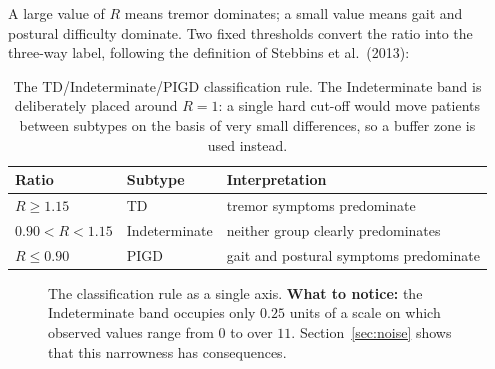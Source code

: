 \documentclass[11pt,a4paper]{article}
\begin{document}
A large value of $R$ means tremor dominates; a small value means gait and
postural difficulty dominate. Two fixed thresholds convert the ratio into the
three-way label, following the definition of Stebbins et al.\ (2013):

\begin{table}[H]
\centering
\begin{tabular}{@{}lll@{}}
\toprule
\textbf{Ratio} & \textbf{Subtype} & \textbf{Interpretation} \\
\midrule
$R \geq 1.15$        & TD            & tremor symptoms predominate \\
$0.90 < R < 1.15$    & Indeterminate & neither group clearly predominates \\
$R \leq 0.90$        & PIGD          & gait and postural symptoms predominate \\
\bottomrule
\end{tabular}
\caption{The TD/Indeterminate/PIGD classification rule. The Indeterminate band
is deliberately placed around $R = 1$: a single hard cut-off would move patients
between subtypes on the basis of very small differences, so a buffer zone is
used instead.}
\end{table}

\begin{figure}[H]
\centering
{}
\caption{The classification rule as a single axis. \textbf{What to notice:} the
Indeterminate band occupies only $0.25$ units of a scale on which observed
values range from $0$ to over $11$. Section~\ref{sec:noise} shows that this
narrowness has consequences.}
\label{fig:rule}
\end{figure}
\end{document}
